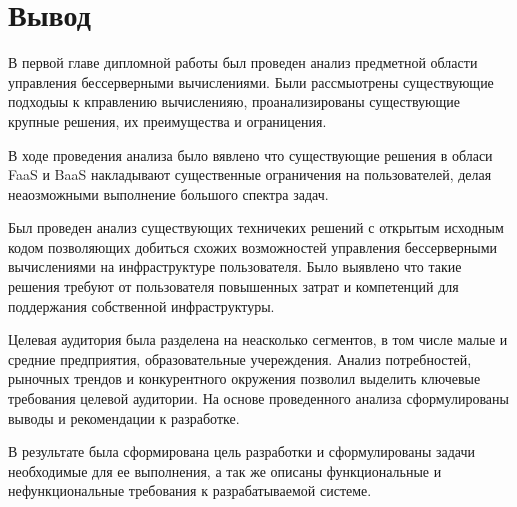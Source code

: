 \section{Вывод}


В первой главе дипломной работы был проведен анализ предметной области управления бессерверными вычислениями.
Были рассмыотрены существующие подходыы к кправлению вычисленияю, проанализированы существующие крупные решения, их преимущества и ограницения.

В ходе проведения анализа было вявлено что существующие решения в обласи FaaS и BaaS накладывают существенные ограничения на пользователей, делая неаозможными выполнение большого спектра задач.

Был проведен анализ существующих техничеких решений с открытым исходным кодом позволяющих добиться схожих возможностей управления бессерверными вычислениями на инфраструктуре пользователя. Было выявлено что такие решения требуют от пользователя повышенных затрат и компетенций для поддержания собственной инфраструктуры.

Целевая аудитория была разделена на неасколько сегментов, в том числе малые и средние предприятия, образовательные учереждения.
Анализ потребностей, рыночных трендов и конкурентного окружения позволил выделить ключевые требования целевой аудитории. На основе проведенного анализа сформулированы выводы и рекомендации к разработке.

В результате была сформирована цель разработки и сформулированы задачи необходимые для ее выполнения, а так же описаны функциональные и нефункциональные требования к разрабатываемой системе.

